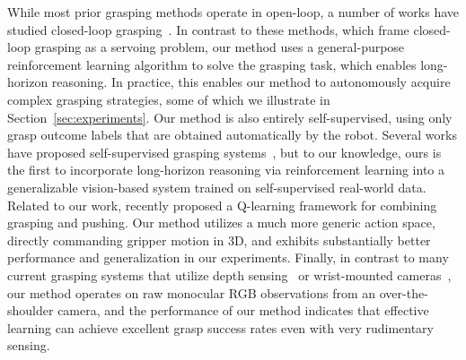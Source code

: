 \documentclass{article}
\begin{document}
While most prior grasping methods operate in open-loop, a number of works have studied closed-loop grasping~\citep{yu2018icra,platt17,hausman17,levine16}. In contrast to these methods, which frame closed-loop grasping as a servoing problem, our method uses a general-purpose reinforcement learning algorithm to solve the grasping task, which enables long-horizon reasoning. In practice, this enables our method to autonomously acquire complex grasping strategies, some of which we illustrate in Section~\ref{sec:experiments}. Our method is also entirely self-supervised, using only grasp outcome labels that are obtained automatically by the robot. Several works have proposed self-supervised grasping systems~\citep{pinto16,levine16}, but to our knowledge, ours is the first to incorporate long-horizon reasoning via reinforcement learning into a generalizable vision-based system trained on self-supervised real-world data. Related to our work, \citet{zeng2018} recently proposed a Q-learning framework for combining grasping and pushing. Our method utilizes a much more generic action space, directly commanding gripper motion in 3D, and exhibits substantially better performance and generalization in our experiments. Finally, in contrast to many current grasping systems that utilize depth sensing~\cite{dexnet30_2017, morrison18} or wrist-mounted cameras~\cite{platt17, morrison18}, our method operates on raw monocular RGB observations from an over-the-shoulder camera, and the performance of our method indicates that effective learning can achieve excellent grasp success rates even with very rudimentary sensing.
\end{document}
